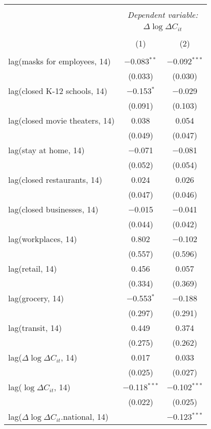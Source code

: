 \begin{tabular}{@{\extracolsep{1pt}}lcc} 
\\[-1.8ex]\hline 
\hline \\[-1.8ex] 
 & \multicolumn{2}{c}{\textit{Dependent variable:}} \\ 
\cline{2-3} 
 & \multicolumn{2}{c}{$\Delta \log \Delta C_{it}$} \\ 
\\[-1.8ex] & (1) & (2)\\ 
\hline \\[-1.8ex] 
 lag(masks for employees, 14) & $-$0.083$^{**}$ & $-$0.092$^{***}$ \\ 
  & (0.033) & (0.030) \\ 
  lag(closed K-12 schools, 14) & $-$0.153$^{*}$ & $-$0.029 \\ 
  & (0.091) & (0.103) \\ 
  lag(closed movie theaters, 14) & 0.038 & 0.054 \\ 
  & (0.049) & (0.047) \\ 
  lag(stay at home, 14) & $-$0.071 & $-$0.081 \\ 
  & (0.052) & (0.054) \\ 
  lag(closed restaurants, 14) & 0.024 & 0.026 \\ 
  & (0.047) & (0.046) \\ 
  lag(closed businesses, 14) & $-$0.015 & $-$0.041 \\ 
  & (0.044) & (0.042) \\ 
  lag(workplaces, 14) & 0.802 & $-$0.102 \\ 
  & (0.557) & (0.596) \\ 
  lag(retail, 14) & 0.456 & 0.057 \\ 
  & (0.334) & (0.369) \\ 
  lag(grocery, 14) & $-$0.553$^{*}$ & $-$0.188 \\ 
  & (0.297) & (0.291) \\ 
  lag(transit, 14) & 0.449 & 0.374 \\ 
  & (0.275) & (0.262) \\ 
  lag($\Delta \log \Delta C_{it}$, 14) & 0.017 & 0.033 \\ 
  & (0.025) & (0.027) \\ 
  lag($\log \Delta C_{it}$, 14) & $-$0.118$^{***}$ & $-$0.102$^{***}$ \\ 
  & (0.022) & (0.025) \\ 
  lag($\Delta \log \Delta C_{it}$.national, 14) &  & $-$0.123$^{***}$ \\ 

\end{tabular}
